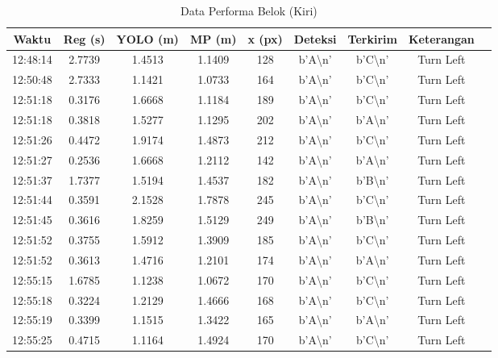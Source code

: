 \begin{table}[H]
    \centering
    \caption{Data Performa Belok (Kiri)}
    \label{tab:performa_belok_kiri}
    \begin{tabular}{|c|c|c|c|c|c|c|c|c|}
    \hline
    Waktu & Reg (s) & YOLO (m) & MP (m) & x (px) & Deteksi & Terkirim & Keterangan \\ \hline
    12:48:14 & 2.7739 & 1.4513 & 1.1409 & 128 & b'A\textbackslash n' & b'C\textbackslash n' & Turn Left \\ \hline
    12:50:48 & 2.7333 & 1.1421 & 1.0733 & 164 & b'A\textbackslash n' & b'C\textbackslash n' & Turn Left \\ \hline
    12:51:18 & 0.3176 & 1.6668 & 1.1184 & 189 & b'A\textbackslash n' & b'C\textbackslash n' & Turn Left \\ \hline
    12:51:18 & 0.3818 & 1.5277 & 1.1295 & 202 & b'A\textbackslash n' & b'A\textbackslash n' & Turn Left \\ \hline
    12:51:26 & 0.4472 & 1.9174 & 1.4873 & 212 & b'A\textbackslash n' & b'C\textbackslash n' & Turn Left \\ \hline
    12:51:27 & 0.2536 & 1.6668 & 1.2112 & 142 & b'A\textbackslash n' & b'A\textbackslash n' & Turn Left \\ \hline
    12:51:37 & 1.7377 & 1.5194 & 1.4537 & 182 & b'A\textbackslash n' & b'B\textbackslash n' & Turn Left \\ \hline
    12:51:44 & 0.3591 & 2.1528 & 1.7878 & 245 & b'A\textbackslash n' & b'C\textbackslash n' & Turn Left \\ \hline
    12:51:45 & 0.3616 & 1.8259 & 1.5129 & 249 & b'A\textbackslash n' & b'B\textbackslash n' & Turn Left \\ \hline
    12:51:52 & 0.3755 & 1.5912 & 1.3909 & 185 & b'A\textbackslash n' & b'C\textbackslash n' & Turn Left \\ \hline
    12:51:52 & 0.3613 & 1.4716 & 1.2101 & 174 & b'A\textbackslash n' & b'A\textbackslash n' & Turn Left \\ \hline
    12:55:15 & 1.6785 & 1.1238 & 1.0672 & 170 & b'A\textbackslash n' & b'C\textbackslash n' & Turn Left \\ \hline
    12:55:18 & 0.3224 & 1.2129 & 1.4666 & 168 & b'A\textbackslash n' & b'C\textbackslash n' & Turn Left \\ \hline
    12:55:19 & 0.3399 & 1.1515 & 1.3422 & 165 & b'A\textbackslash n' & b'A\textbackslash n' & Turn Left \\ \hline
    12:55:25 & 0.4715 & 1.1164 & 1.4924 & 170 & b'A\textbackslash n' & b'C\textbackslash n' & Turn Left \\ \hline

\end{tabular}
\end{table}
